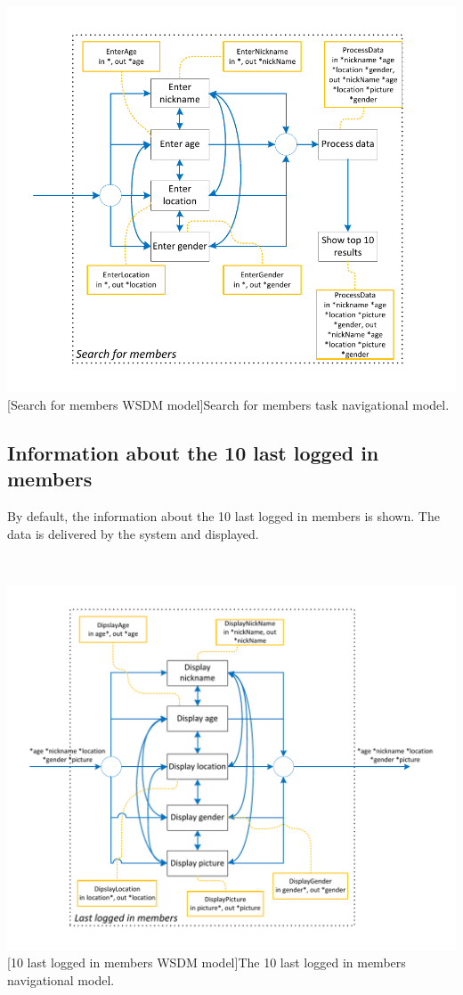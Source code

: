 \documentclass[11pt, a4paper,svglistings,oneside]{book}
\begin{document}
$\;$ \\
\noindent\begin{minipage}{\textwidth}
    \centering
   \includegraphics[scale=1]{Nav_SearchForMembers.pdf}
 [Search for members WSDM model]{Search for members task navigational model.}
\end{minipage}

\subsection{Information about the 10 last logged in members}

By default, the information about the 10 last logged in members is shown. The data is delivered by the system and displayed.

$\;$ \\
\noindent\begin{minipage}{\textwidth}
    \centering
   \includegraphics[scale=1]{Nav_LastLoggedInMembers.pdf}
 [10 last logged in members WSDM model]{The 10 last logged in members navigational model.}
\end{minipage}
$\;$ \\ 
\end{document}
